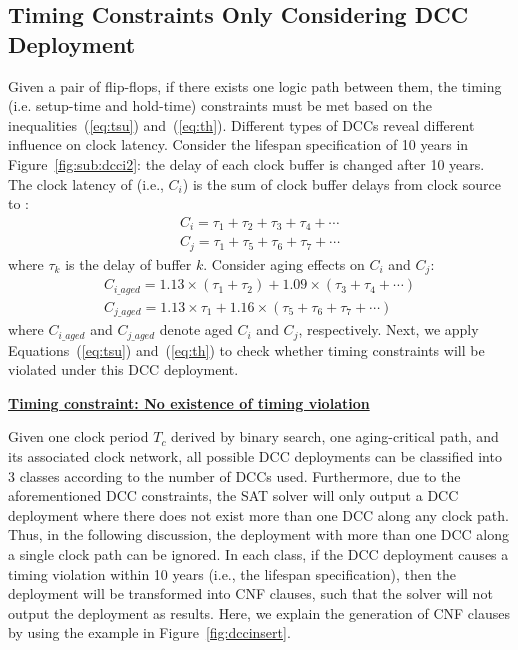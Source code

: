 \subsection{Timing Constraints Only Considering DCC Deployment}
\label{subsec:tccc}
Given a pair of flip-flops, if there exists one logic path between them, the timing (i.e. setup-time and hold-time) constraints must be met based on the inequalities~(\ref{eq:tsu}) and~(\ref{eq:th}). Different types of DCCs reveal different influence on clock latency. Consider the lifespan specification of 10 years in Figure~\ref{fig:sub:dcci2}: the delay of each clock buffer is changed after 10 years. The clock latency of  (i.e., $C_i$) is the sum of clock buffer delays from clock source to : 
\begin{gather*}
C_i = \tau_1 + \tau_2 + \tau_3 + \tau_4 +\dotsb \\
C_j = \tau_1 + \tau_5 + \tau_6 + \tau_7 +\dotsb
\end{gather*}
where $\tau_k$ is the delay of buffer $k$. Consider aging effects on $C_i$ and $C_j$: 
\begin{gather*}
C_{i\_aged} = 1.13 \times \left(\tau_1 + \tau_2\right) + 1.09 \times \left(\tau_3 + \tau_4 + \dotsb\right)\\
C_{j\_aged} = 1.13 \times \tau_1+ 1.16 \times \left( \tau_5 + \tau_6 + \tau_7 + \dotsb \right)
\end{gather*}
where $C_{i\_aged}$ and $C_{j\_aged}$ denote aged $C_i$ and $C_j$, respectively. Next, we apply Equations~(\ref{eq:tsu}) and~(\ref{eq:th}) to check whether timing constraints will be violated under this DCC deployment.

\noindent \textbf{\uline{Timing constraint: No existence of timing violation}}

Given one clock period $T_c$ derived by binary search, one aging-critical path, and its associated clock network, all possible DCC deployments can be classified into 3 classes according to the number of DCCs used. Furthermore, due to the aforementioned DCC constraints, the SAT solver will only output a DCC deployment where there does not exist more than one DCC along any clock path. Thus, in the following discussion, the deployment with more than one DCC along a single clock path can be ignored. In each class, if the DCC deployment causes a timing violation within 10 years (i.e., the lifespan specification), then the deployment will be transformed into CNF clauses, such that the solver will not output the deployment as results. Here, we explain the generation of CNF clauses by using the example in Figure~\ref{fig:dccinsert}.

